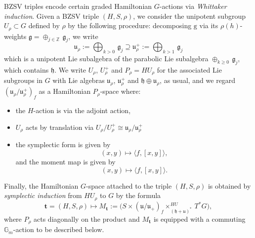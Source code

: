 \documentclass[11pt, a4paper]{amsart}
\numberwithin{equation}{section}
\theoremstyle{definition}
\theoremstyle{remark}
\newcommand{\g}{\mathrm{g}}
\newcommand{\GG}{\mathbb{G}}
\newcommand{\ZZ}{\mathbb{Z}}
\begin{document}
BZSV triples encode certain graded Hamiltonian $G$-actions via \textit{Whittaker induction}. Given a BZSV triple $(H, S, \rho)$, we consider the unipotent subgroup $U_\rho \subset G$ defined by $\rho$ by the following procedure: decomposing $\g$ via its $\rho(h)$-weights $\mathfrak{g} = \oplus_{j \in \ZZ} \, \mathfrak{g}_j$, we write
\begin{equation} \label{eq JM computation}
    \mathfrak{u}_\rho := \bigoplus_{k > 0} \, \mathfrak{g}_j \supseteq \mathfrak{u}_\rho^+ := \bigoplus_{k > 1} \, \mathfrak{g}_j
\end{equation}
which is a unipotent Lie subalgebra of the parabolic Lie subalgebra $\oplus_{k \geq 0} \, \mathfrak{g}_j$, which contains $\mathfrak{h}$. We write $U_\rho$, $U_\rho^+$ and $P_\rho = H U_\rho$ for the associated Lie subgroups in $G$ with Lie algebras $\mathfrak{u}_\rho$, $\mathfrak{u}_\rho^+$ and $\mathfrak{h} \oplus \mathfrak{u}_\rho$, as usual, and we regard $(\mathfrak{u}_\rho/\mathfrak{u}_\rho^+)_f$ as a Hamiltonian $P_\rho$-space where:
\begin{itemize}
\item the $H$-action is via the adjoint action, 
\item $U_\rho$ acts by translation via $U_\rho/U_\rho^+ \cong \mathfrak{u}_\rho/\mathfrak{u}_\rho^+$
\item the symplectic form is given by
\[
(x,y) \longmapsto \langle f, [x,y]\rangle, 
\]
and the moment map is given by
\[
(x,y) \longmapsto \langle f, [x,y]\rangle.
\]
\end{itemize}
Finally, the Hamiltonian $G$-space attached to the triple $(H, S, \rho)$ is obtained by \textit{symplectic induction} from $H U_\rho$ to $G$ by the formula
\begin{equation} \label{eq Whittaker induction}
\mathbf{t} = (H,S, \rho) \longmapsto M_{\mathbf{t}} := 
\bigg(S \times (\mathfrak{u}/\mathfrak{u}_+)_f \times^{HU}_{(\mathfrak{h}+\mathfrak{u})^*} \, T^*G\bigg),
\end{equation}
where $P_\rho$ acts diagonally on the product and $M_{\mathbf{t}}$ is equipped with a commuting $\GG_m$-action to be described below. 
\end{document}
